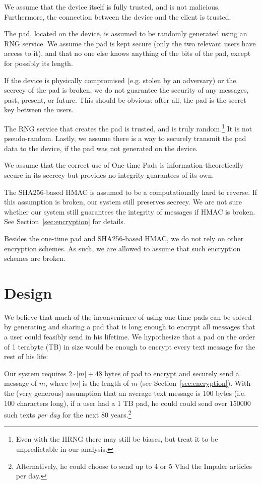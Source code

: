 \documentclass[twocolumn]{article}
\begin{document}
We assume that the device itself is fully trusted, and is not malicious. Furthermore, the connection between the device and the client is trusted.

The pad, located on the device, is assumed to be randomly generated using an RNG service. We assume the pad is kept secure (only the two relevant users have access to it), and that no one else knows anything of the bits of the pad, except for possibly its length. 

If the device is physically compromised (e.g. stolen by an adversary) or the secrecy of the pad is broken, we do not guarantee the security of any messages, past, present, or future. This should be obvious: after all, the pad is the secret key between the users.

The RNG service that creates the pad is trusted, and is truly random.\footnote{
Even with the HRNG there may still be biases, but treat it to be unpredictable in our analysis.
}
It is not pseudo-random. Lastly, we assume there is a way to securely transmit the pad data to the device, if the pad was not generated on the device.

We assume that the correct use of One-time Pads is information-theoretically secure in its secrecy but provides no integrity guarantees of its own.

The SHA256-based HMAC is assumed to be a computationally hard to reverse. If this assumption is broken, our system still preserves secrecy. We are not sure whether our system still guarantees the integrity of messages if HMAC is broken. See Section~\ref{sec:encryption} for details.

Besides the one-time pad and SHA256-based HMAC, we do not rely on other encryption schemes. As such, we are allowed to assume that such encryption schemes are broken.

\section{Design}
We believe that much of the inconvenience of using one-time pads can be solved by generating and sharing a pad that is long enough to encrypt all messages that a user could feasibly send in his lifetime. We hypothesize that a pad on the order of 1 terabyte (TB) in size would be enough to encrypt every text message for the rest of his life:

Our system requires $2\cdot |m| + 48$ bytes of pad to encrypt and securely send a message of $m$, where $|m|$ is the length of $m$ (see Section~\ref{sec:encryption}). With the (very generous) assumption that an average text message is 100 bytes (i.e. 100 characters long), if a user had a 1 TB pad, he could could send over $150000$ such texts \emph{per day} for the next 80 years.\footnote{
Alternatively, he could choose to send up to 4 or 5 Vlad the Impaler articles per day.
}
\end{document}
